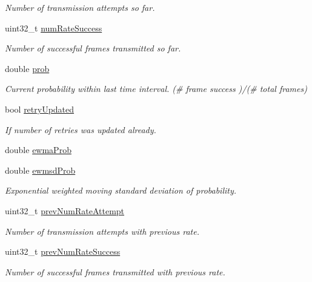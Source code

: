 \begin{DoxyCompactItemize}
\begin{DoxyCompactList}\small\item\em Number of transmission attempts so far. \end{DoxyCompactList}\item 
uint32\+\_\+t \hyperlink{structns3_1_1HtRateInfo_a04d577e09bdf8fdd602f1dfba8f126c5}{num\+Rate\+Success}
\begin{DoxyCompactList}\small\item\em Number of successful frames transmitted so far. \end{DoxyCompactList}\item 
double \hyperlink{structns3_1_1HtRateInfo_a4b46afa48d35b797553455bfce1fc24c}{prob}
\begin{DoxyCompactList}\small\item\em Current probability within last time interval. (\# frame success )/(\# total frames) \end{DoxyCompactList}\item 
bool \hyperlink{structns3_1_1HtRateInfo_a92a39b7035f7a75130d3862c864e226b}{retry\+Updated}
\begin{DoxyCompactList}\small\item\em If number of retries was updated already. \end{DoxyCompactList}\item 
double \hyperlink{structns3_1_1HtRateInfo_a9199564f7081a66b86dd8bedc0d22e58}{ewma\+Prob}
\item 
double \hyperlink{structns3_1_1HtRateInfo_a87a212e1f1d780658899eb9a26be4e44}{ewmsd\+Prob}
\begin{DoxyCompactList}\small\item\em Exponential weighted moving standard deviation of probability. \end{DoxyCompactList}\item 
uint32\+\_\+t \hyperlink{structns3_1_1HtRateInfo_ad3b1b49cc4954e8019d598ab196a1d55}{prev\+Num\+Rate\+Attempt}
\begin{DoxyCompactList}\small\item\em Number of transmission attempts with previous rate. \end{DoxyCompactList}\item 
uint32\+\_\+t \hyperlink{structns3_1_1HtRateInfo_addf7ac29ab4fed7e27c5ccc759c18efb}{prev\+Num\+Rate\+Success}
\begin{DoxyCompactList}\small\item\em Number of successful frames transmitted with previous rate. \end{DoxyCompactList}\item 

\end{DoxyCompactItemize}
